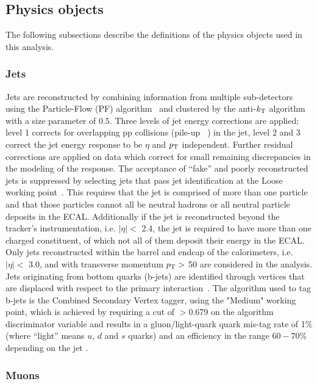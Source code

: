 \subsection{Physics objects\label{sec:reconstruction}}

The following subsections describe the definitions of the physics objects 
used in this analysis.

\subsubsection{Jets\label{recJet}}

Jets are reconstructed by combining information from multiple
sub-detectors using the Particle-Flow (PF) algorithm~\cite{PAS-PFT-09-001} 
and clustered by the anti-$k_{\rm T}$ algorithm~\cite{antikt} with
a size parameter of $0.5$. Three levels of jet energy corrections are 
applied; level 1 corrects for overlapping pp collisions 
(pile-up ~\cite{Cacciari2008119,1126-6708-2008-04-005}) in the jet, 
level 2 and 3 correct the jet energy response to be $\eta$ and $p_{\mathrm{T}}$ independent.  
Further residual corrections are applied on data which correct for 
small remaining discrepancies in the modeling of the response. The acceptance of
``fake''  and poorly reconstructed jets is suppressed by selecting jets that pass 
jet identification at the Loose working point~\cite{ref:jet-id}. This requires 
that the jet is comprised of more than one particle and that those particles 
cannot all be neutral hadrons or all neutral particle deposits in the ECAL. 
Additionally if the jet is reconstructed beyond the tracker's instrumentation, 
i.e. $|\eta| <$ 2.4,  the jet is required to have more than one charged constituent, 
of which not all of them deposit their energy in the ECAL. 
Only jets reconstructed within the barrel and endcap of the calorimeters,
i.e. $|\eta| <$ 3.0, and with transverse momentum $p_{\mathrm{T}} >$ 50\gev  
are considered in the analysis. Jets originating from bottom quarks 
(b-jets) are identified through vertices that are displaced with respect to the primary 
interaction~\cite{CMS-PAS-BTV-12-001}. The algorithm used to tag b-jets 
is the Combined Secondary Vertex tagger, using the "Medium" working point, 
which is achieved by requiring a cut of $>$0.679 on the algorithm discriminator 
variable and results in a gluon/light-quark quark mis-tag rate of 1\% 
(where ``light'' means $u$, $d$ and $s$ quarks) and an efficiency in the 
range $60-70\%$ depending on the jet \pt. 

\subsubsection{Muons\label{sec:recMuon}}

